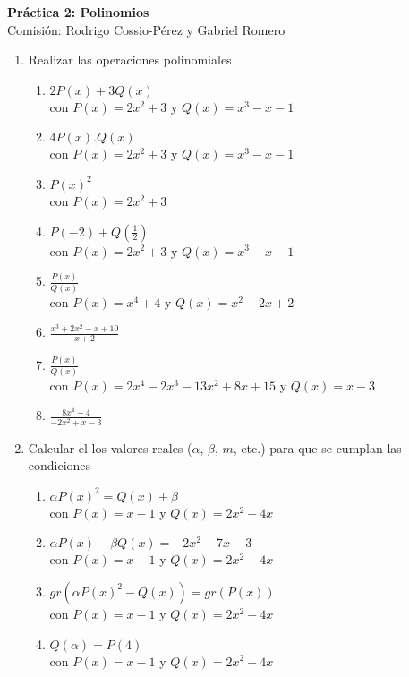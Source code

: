 \documentclass[a4paper]{article}
\newcommand{\exercise}{\item}
\newcommand{\df}[2]{\displaystyle\frac{#1}{#2}}
\begin{document}
\noindent \hrulefill 
\vspace{-7pt}
\begin{center} 
	\textbf{ Práctica 2: Polinomios } \\
	Comisión: Rodrigo Cossio-Pérez y Gabriel Romero
\end{center}
\vspace{-10pt}
\hrulefill
\begin{enumerate}
	\exercise Realizar las operaciones polinomiales
	\begin{multicols}{2}
	\begin{enumerate} [label=(\alph*)]
		\item $2P(x)+3Q(x)$ \\con $P(x)=2x^2+3$ y $Q(x)=x^3-x-1$
		\item $4P(x).Q(x)$ \\con $P(x)=2x^2+3$ y $Q(x)=x^3-x-1$
		\item $P(x)^2$ \\con $P(x)=2x^2+3$
		\item $P(-2)+Q\left(\df{1}{2}\right)$ \\con $P(x)=2x^2+3$ y $Q(x)=x^3-x-1$
		\item $\df{P(x)}{Q(x)}$ \\con $P(x)=x^4+4$ y $Q(x)=x^2+2x+2$
		\item $\df{x^3+2x^2-x+10}{x+2}$
		\item $\df{P(x)}{Q(x)}$ \\con $P(x)=2x^4-2x^3-13x^2+8x+15$ y $Q(x)=x-3$
		\item $\df{8x^4-4}{-2x^2+x-3}$
	\end{enumerate}
	\end{multicols}
	\exercise Calcular el los valores reales ($\alpha$, $\beta$, $m$, etc.) para que se cumplan las condiciones
	\begin{multicols}{2}
	\begin{enumerate} [label=(\alph*)]
		\item $\alpha P(x)^2 = Q(x) +\beta$ \\con $P(x)=x-1$ y $Q(x)=2x^2-4x$
		\item $\alpha P(x)-\beta Q(x) = -2x^2 +7x-3$ \\con $P(x)=x-1$ y $Q(x)=2x^2-4x$
		\item $gr\left(\alpha P(x)^2 - Q(x)\right)=gr\left(P(x)\right)$ \\con $P(x)=x-1$ y $Q(x)=2x^2-4x$
		\item $Q(\alpha)=P(4)$ \\con $P(x)=x-1$ y $Q(x)=2x^2-4x$

\end{enumerate}
\end{multicols}
\end{enumerate}
\end{document}

